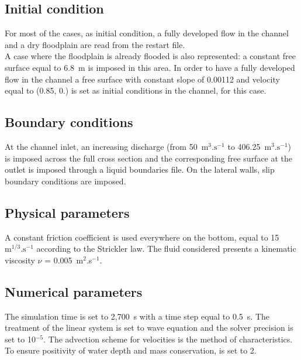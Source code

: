\subsection{Initial condition}\label{subs:breach:IC}
For most of the cases, as initial condition, a fully developed flow in the
channel and a dry floodplain are read from the restart file. \\
A case where the floodplain is already flooded is also represented: a constant
free surface equal to 6.8~m is imposed in this area. In order to have a fully
developed flow in the channel a free surface with constant slope of 0.00112 and
velocity equal to (0.85, 0.) is set as initial conditions in the channel, for
this case.

\subsection{Boundary conditions}
At the channel inlet, an increasing discharge
(from 50~$\text{m}^{3}.\text{s}^{-1}$ to 406.25~$\text{m}^{3}.\text{s}^{-1}$) is
imposed across the full cross section and the corresponding free surface at
the outlet is imposed through a liquid boundaries file. On the lateral walls,
slip boundary conditions are imposed.

\subsection{Physical parameters}
A constant friction coefficient is used everywhere on the bottom, equal to
15~$\text{m}^{1/3}.\text{s}^{-1}$ according to the Strickler law.
The fluid considered presents a kinematic viscosity $\nu$ = 0.005~m$^2$.s$^{-1}$.

\subsection{Numerical parameters}
The simulation time is set to 2,700~s with a time step equal to 0.5~s. The
treatment of the linear system is set to wave equation and the solver precision
is set to 10$^{-5}$. The advection scheme for velocities is the method of
characteristics. To ensure positivity of water depth and mass conservation,
 is set to 2.

